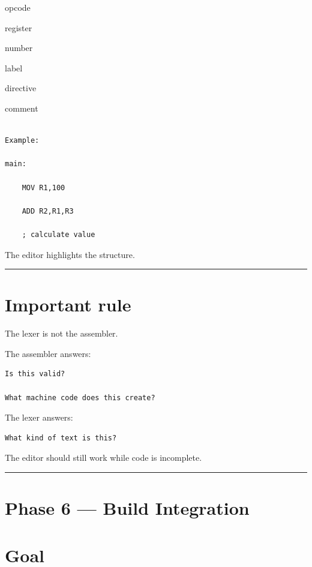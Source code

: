 \documentclass[
  oneside,
  openany]{book}
\begin{document}
opcode

register

number

label

directive

comment

\begin{verbatim}

Example:

main:

    MOV R1,100

    ADD R2,R1,R3

    ; calculate value
\end{verbatim}

The editor highlights the structure.

\begin{center}\rule{0.5\linewidth}{0.5pt}\end{center}

\hypertarget{important-rule}{%
\section{Important rule}\label{important-rule}}

The lexer is not the assembler.

The assembler answers:

\begin{verbatim}
Is this valid?

What machine code does this create?
\end{verbatim}

The lexer answers:

\begin{verbatim}
What kind of text is this?
\end{verbatim}

The editor should still work while code is incomplete.

\begin{center}\rule{0.5\linewidth}{0.5pt}\end{center}

\hypertarget{phase-6-build-integration}{%
\section{Phase 6 --- Build
Integration}\label{phase-6-build-integration}}

\hypertarget{goal}{%
\section{Goal}\label{goal}}
\end{document}
